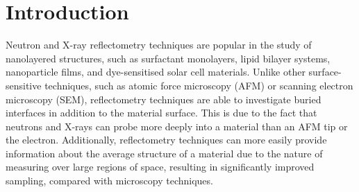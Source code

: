 \documentclass[twoside,twocolumn,9pt]{article}
\begin{document}
\section*{}
\vspace{-1cm}








\section{Introduction}
Neutron and X-ray reflectometry techniques are popular in the study of nanolayered structures, such as surfactant monolayers,\cite{Hazell2016} lipid bilayer systems,\cite{Belicka2015} nanoparticle films,\cite{Velleman2016} and dye-sensitised solar cell materials.\cite{McCreeGrey2015}
Unlike other surface-sensitive techniques, such as atomic force microscopy (AFM) or scanning electron microscopy (SEM), reflectometry techniques are able to investigate buried interfaces in addition to the material surface.
This is due to the fact that neutrons and X-rays can probe more deeply into a material than an AFM tip or the electron.
Additionally, reflectometry techniques can more easily provide information about the average structure of a material due to the nature of measuring over large regions of space, resulting in significantly improved sampling, compared with microscopy techniques.\cite{Renaud2009}
\end{document}
